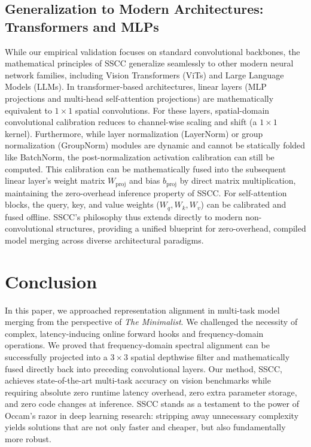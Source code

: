 \documentclass{article}
\theoremstyle{plain}
\theoremstyle{definition}
\theoremstyle{remark}
\begin{document}
\subsection{Generalization to Modern Architectures: Transformers and MLPs}
While our empirical validation focuses on standard convolutional backbones, the mathematical principles of SSCC generalize seamlessly to other modern neural network families, including Vision Transformers (ViTs) and Large Language Models (LLMs). 
In transformer-based architectures, linear layers (MLP projections and multi-head self-attention projections) are mathematically equivalent to $1 \times 1$ spatial convolutions. For these layers, spatial-domain convolutional calibration reduces to channel-wise scaling and shift (a $1 \times 1$ kernel). 
Furthermore, while layer normalization (LayerNorm) or group normalization (GroupNorm) modules are dynamic and cannot be statically folded like BatchNorm, the post-normalization activation calibration can still be computed. This calibration can be mathematically fused into the subsequent linear layer's weight matrix $W_{\text{proj}}$ and bias $b_{\text{proj}}$ by direct matrix multiplication, maintaining the zero-overhead inference property of SSCC.
For self-attention blocks, the query, key, and value weights ($W_q, W_k, W_v$) can be calibrated and fused offline. SSCC's philosophy thus extends directly to modern non-convolutional structures, providing a unified blueprint for zero-overhead, compiled model merging across diverse architectural paradigms.

\section{Conclusion}
In this paper, we approached representation alignment in multi-task model merging from the perspective of \textit{The Minimalist}. We challenged the necessity of complex, latency-inducing online forward hooks and frequency-domain operations. We proved that frequency-domain spectral alignment can be successfully projected into a $3 \times 3$ spatial depthwise filter and mathematically fused directly back into preceding convolutional layers. Our method, SSCC, achieves state-of-the-art multi-task accuracy on vision benchmarks while requiring absolute zero runtime latency overhead, zero extra parameter storage, and zero code changes at inference. SSCC stands as a testament to the power of Occam's razor in deep learning research: stripping away unnecessary complexity yields solutions that are not only faster and cheaper, but also fundamentally more robust.



\end{document}
